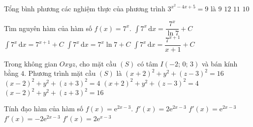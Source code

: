 \begin{ex}%
Tổng bình phương các nghiệm thực của phương trình ${{3}^{x^2-4x+5}}=9$ là 
\choice 
{ $9$}
{ $12$}
{ $11$}
{ \True $10$}
\end{ex} 

\begin{ex}%
Tìm nguyên hàm của hàm số $f( x )=7^{x}$.
\choice 
{ \True $\displaystyle\int 7^{x}\mathrm{\,d}x=\dfrac{7^x}{\ln 7}+C$}
{ $\displaystyle\int 7^x\mathrm{\,d}x=7^{x+1}+C$}
{ $\displaystyle\int 7^{x}\mathrm{\,d}x=7^{x}\ln 7+C$}
{ $\displaystyle\int 7^{x}\mathrm{\,d}x=\dfrac{7^{x+1}}{x+1}+C$}
\end{ex} 

\begin{ex}%
Trong không gian $Oxyz$, cho mặt cầu $( S )$ có tâm $I( -2;\,0;\,3 )$ và bán kính bằng $4$. Phương trình mặt cầu $( S )$ là
\choice 
{ \True ${{( x+2 )}^2}+{{y}^2}+{{( z-3 )}^2}=16$}
{ ${{( x-2 )}^2}+{{y}^2}+{{( z+3 )}^2}=4$} 
{ ${{( x+2 )}^2}+{{y}^2}+{{( z-3 )}^2}=4$}
{ ${{( x-2 )}^2}+{{y}^2}+{{( z+3 )}^2}=16$}
\end{ex} 

\begin{ex}%
Tính đạo hàm của hàm số $f( x )={\mathrm{e}^{2x-3}}$.
\choice 
{ \True $f'( x )=2{\mathrm{e}^{2x-3}}$}
{ $f'( x )={\mathrm{e}^{2x-3}}$}
{ $f'( x )=-2{\mathrm{e}^{2x-3}}$}
{ $f'( x )=2{\mathrm{e}^{x-3}}$}
\end{ex} 

